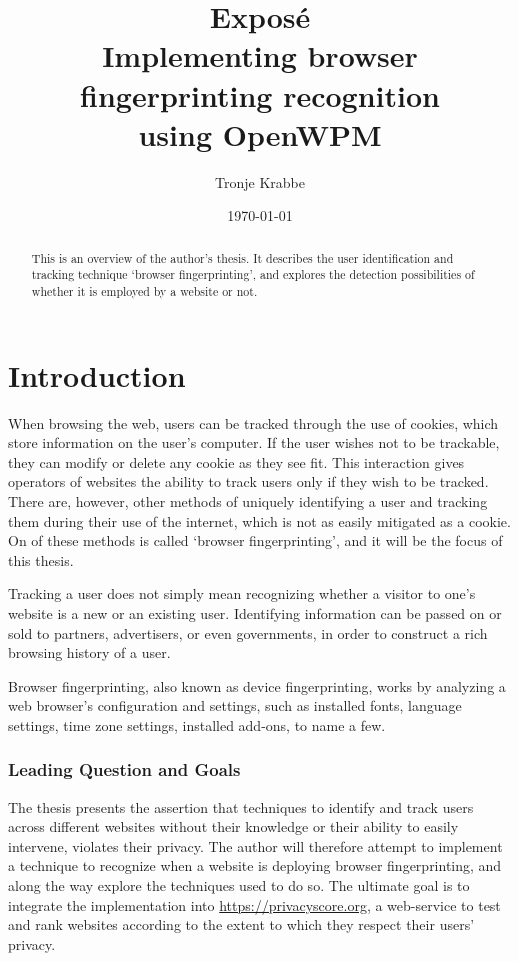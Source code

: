 \documentclass[a4paper, 12pt]{scrreprt}
\title{
	Exposé\\
	\medskip
	\large Implementing browser fingerprinting recognition \\
    using OpenWPM
}
\author{Tronje Krabbe}
\date{\today}
\begin{document}
\hypersetup{hidelinks}

\maketitle

\begin{abstract}
	\doublespacing
    This is an overview of the author's thesis. It describes the user identification and tracking technique `browser fingerprinting',
    and explores the detection possibilities of whether it is employed by a website or not.
\end{abstract}

\tableofcontents

\chapter{Introduction}
When browsing the web, users can be tracked through the use of cookies, which store information on the user's computer.
If the user wishes not to be trackable, they can modify or delete any cookie as they see fit. This interaction gives
operators of websites the ability to track users only if they wish to be tracked.
There are, however, other methods of uniquely identifying a user and tracking them during their use of the internet,
which is not as easily mitigated as a cookie.\cite{am_i_unique} On of these methods is called `browser fingerprinting', and it will be
the focus of this thesis.

Tracking a user does not simply mean recognizing whether a visitor to one's website is a new or an existing user.
Identifying information can be passed on or sold to partners, advertisers, or even governments, in order to
construct a rich browsing history of a user.

Browser fingerprinting, also known as device fingerprinting, works by analyzing a web browser's configuration and settings,
such as installed fonts, language settings, time zone settings, installed add-ons, to name a few.\cite{panopticlick}

    \subsection{Leading Question and Goals}
    The thesis presents the assertion that techniques to identify and track users across different websites without
    their knowledge or their ability to easily intervene, violates their privacy.
    The author will therefore attempt to implement a technique to recognize when a website is deploying browser fingerprinting,
    and along the way explore the techniques used to do so.
    The ultimate goal is to integrate the implementation into \url{https://privacyscore.org}, a web-service to test and rank
    websites according to the extent to which they respect their users' privacy.
\end{document}
